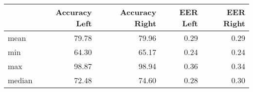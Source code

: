 \begin{tabular}{lrrrr}
\toprule
{} &  Accuracy Left &  Accuracy Right &  EER Left &  EER Right \\
\midrule
mean   &          79.78 &           79.96 &      0.29 &       0.29 \\
min    &          64.30 &           65.17 &      0.24 &       0.24 \\
max    &          98.87 &           98.94 &      0.36 &       0.34 \\
median &          72.48 &           74.60 &      0.28 &       0.30 \\
\bottomrule
\end{tabular}
